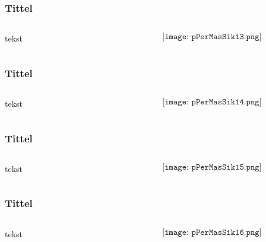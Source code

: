 \documentclass[aspectratio=169,xcolor=dvipsnames]{beamer}
\begin{document}
\begin{frame}
	\frametitle{Tittel}
	\begin{columns}
		\begin{column}{0.5\textwidth}
tekst
			
		\end{column}

		\begin{column}{0.5\textwidth}
	$$\texttt{[image: pPerMasSik13.png]}$$
		\end{column}
	\end{columns}
\end{frame}

\begin{frame}
	\frametitle{Tittel}
	\begin{columns}
		\begin{column}{0.5\textwidth}
tekst
			
		\end{column}

		\begin{column}{0.5\textwidth}
	$$\texttt{[image: pPerMasSik14.png]}$$
		\end{column}
	\end{columns}
\end{frame}

\begin{frame}
	\frametitle{Tittel}
	\begin{columns}
		\begin{column}{0.5\textwidth}
tekst
			
		\end{column}

		\begin{column}{0.5\textwidth}
	$$\texttt{[image: pPerMasSik15.png]}$$
		\end{column}
	\end{columns}
\end{frame}

\begin{frame}
	\frametitle{Tittel}
	\begin{columns}
		\begin{column}{0.5\textwidth}
tekst
			
		\end{column}

		\begin{column}{0.5\textwidth}
	$$\texttt{[image: pPerMasSik16.png]}$$
		\end{column}
	\end{columns}
\end{frame}
\end{document}
